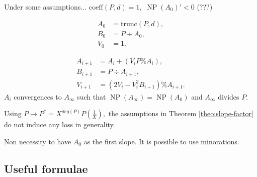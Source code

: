 \documentclass{sig-alternate-2013}
\DeclareMathOperator{\NP}{NP}
\begin{document}
\begin{theo} \label{theo:slope-factor}
Under some assumptions... $\textrm{coeff}(P,d)=1,$ $\NP (A_0)' <0$ (???)

\begin{align*}
A_0 &= \textrm{trunc}(P,d), \\
B_{0} &= P \div A_{0}, \\
V_{0} &= 1.
\end{align*}


\begin{align*}
A_{i+1} &= A_i + (V_i P \% A_i), \\
B_{i+1} &= P \div A_{i+1}, \\
V_{i+1} &= (2 V_i -V_i^2 B_{i+1} ) \% A_{i+1}.
\end{align*}
$A_i$ convergences to $A_\infty$ such that $\NP (A_\infty)= \NP (A_0)$ and $A_\infty$ divides $P.$
\end{theo}

\begin{rem}
Using $P \mapsto P^*=X^{deg(P)}P \left( \frac{1}{X} \right), $ the assumptions in Theorem \ref{theo:slope-factor} do not induce any loss in generality.
\end{rem}

\begin{rem}
Non necessity to have $A_0$ as the first slope. It is possible to use minorations.

\end{rem}

\subsection{Useful formulae}
\end{document}

